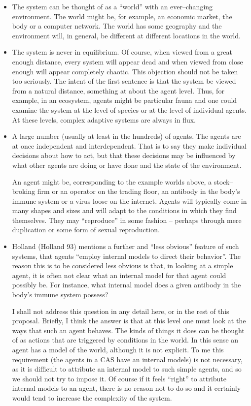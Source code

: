 \begin{itemize}

\item
The system can be thought of as a ``world'' with an ever--changing
environment. The world might be, for example, an economic market, the
body or a computer network. The world has some geography and the
environment will, in general, be different at different locations in
the world.

\item
The system is never in equilibrium. Of course, when viewed from a
great enough distance, every system will appear dead and when viewed
from close enough will appear completely chaotic. This objection should
not be taken too seriously. The intent of the first sentence is that
the system be viewed from a natural distance, something at about the
agent level. Thus, for example, in an ecosystem, agents might be
particular fauna and one could examine the system at the level of
species or at the level of individual agents. At these levels, complex
adaptive systems are always in flux.

\item
A large number (usually at least in the hundreds) of agents. The
agents are at once independent and interdependent. That is to say they
make individual decisions about how to act, but that these decisions
may be influenced by what other agents are doing or have done and the
state of the environment.

An agent might be, corresponding to the example worlds above, a
stock--broking firm or an operator on the trading floor, an antibody in
the body's immune system or a virus loose on the internet. Agents will
typically come in many shapes and sizes and will adapt to the
conditions in which they find themselves. They may ``reproduce'' in
some fashion -- perhaps through mere duplication or some form of
sexual reproduction.

\item 
Holland (Holland 93) mentions a further and ``less obvious'' feature
of such systems, that agents ``employ internal models to direct their
behavior''. The reason this is to be considered less obvious is that,
in looking at a simple agent, it is often not clear what an internal
model for that agent could possibly be. For instance, what internal
model does a given antibody in the body's immune system possess?

I shall not address this question in any detail here, or in the rest
of this proposal. Briefly, I think the answer is that at this level
one must look at the ways that such an agent behaves. The kinds of
things it does can be thought of as actions that are triggered by
conditions in the world. In this sense an agent has a model of the
world, although it is not explicit. To me this requirement (the agents
in a CAS have an internal models) is not necessary, as it is difficult
to attribute an internal model to such simple agents, and so we should
not try to impose it. Of course if it feels ``right'' to attribute
internal models to an agent, there is no reason not to do so and it
certainly would tend to increase the complexity of the system.

\end{itemize}

